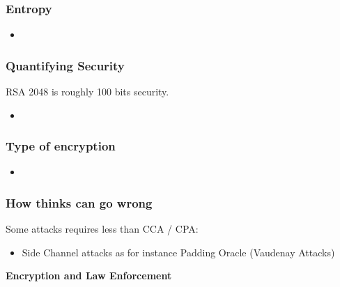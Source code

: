 \documentclass{beamer}
\begin{document}
\begin{frame}
        \frametitle{Entropy}

        \begin{itemize}
          \item
        \end{itemize}

\end{frame}

\begin{frame}
        \frametitle{Quantifying Security}
       RSA 2048 is roughly 100 bits security. 
        \begin{itemize}
          \item 
        \end{itemize}

\end{frame}



\begin{frame}
        \frametitle{Type of encryption}

        \begin{itemize}
          \item
        \end{itemize}

\end{frame}


\begin{frame}
        \frametitle{How thinks can go wrong}
        Some attacks requires less than CCA / CPA:
        \begin{itemize}
          \item Side Channel attacks as for instance Padding Oracle (Vaudenay Attacks)
        \end{itemize}

\end{frame}

\begin{frame}
  \begin{center}
    {\bf Encryption and Law Enforcement}
  \end{center}
\end{frame}
\end{document}
